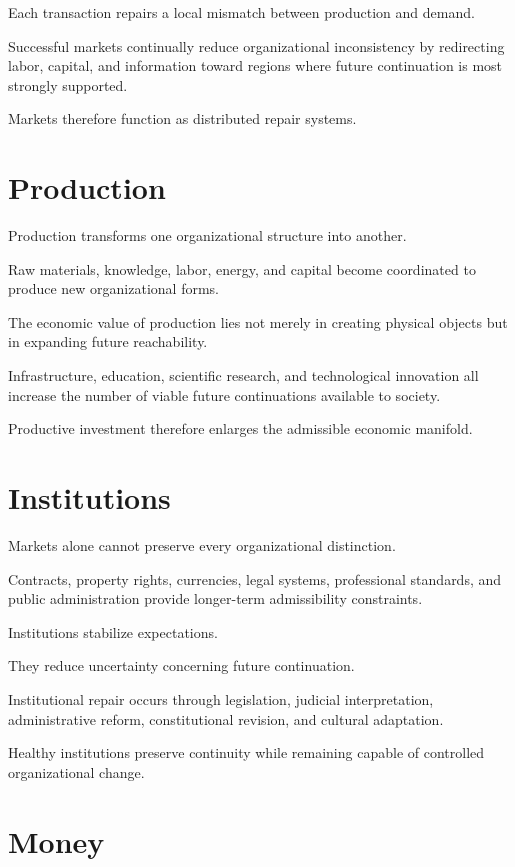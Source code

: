 \documentclass[11pt,oneside]{book}
\numberwithin{equation}{chapter}
\theoremstyle{definition}
\theoremstyle{plain}
\begin{document}
Each transaction repairs a local mismatch between production and demand.

Successful markets continually reduce organizational inconsistency by
redirecting labor, capital, and information toward regions where future
continuation is most strongly supported.

Markets therefore function as distributed repair systems.

\section{Production}

Production transforms one organizational structure into another.

Raw materials, knowledge, labor, energy, and capital become coordinated to
produce new organizational forms.

The economic value of production lies not merely in creating physical
objects but in expanding future reachability.

Infrastructure, education, scientific research, and technological
innovation all increase the number of viable future continuations available
to society.

Productive investment therefore enlarges the admissible economic manifold.

\section{Institutions}

Markets alone cannot preserve every organizational distinction.

Contracts, property rights, currencies, legal systems, professional
standards, and public administration provide longer-term admissibility
constraints.

Institutions stabilize expectations.

They reduce uncertainty concerning future continuation.

Institutional repair occurs through legislation, judicial interpretation,
administrative reform, constitutional revision, and cultural adaptation.

Healthy institutions preserve continuity while remaining capable of
controlled organizational change.

\section{Money}
\end{document}
